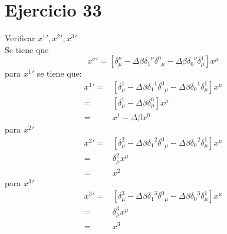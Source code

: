 \section*{Ejercicio 33}
Verificar ${x^1}',{x^2}',{x^3}'$\\
Se tiene que
\begin{equation*}
    {x^\nu}'=\left[\delta_\mu^\nu - \Delta \beta {\delta_1}^\nu {\delta^0}_\mu - \Delta \beta{\delta_0}^\nu \delta_\mu^1\right]x^\mu
\end{equation*}
para ${x^1}'$ se tiene que:
\begin{align*}
    {x^1}'=&\left[\delta_\mu^1 - \Delta \beta {\delta_1}^1 {\delta^0}_\mu - \Delta \beta{\delta_0}^1 \delta_\mu^1\right]x^\mu\\
=&\left[\delta_\mu^1 - \Delta\beta \delta_\mu^0\right] x^\mu\\
=&x^1-\Delta\beta x^0
\end{align*}
para ${x^2}'$
\begin{align*}
    {x^2}'=&\left[\delta_\mu^2 - \Delta \beta {\delta_1}^2 {\delta^0}_\mu - \Delta \beta{\delta_0}^2 \delta_\mu^1\right]x^\mu\\
=& \delta_\mu^2x^\mu\\
=& x^2
\end{align*}
para ${x^3}'$
\begin{align*}
    {x^3}'=&\left[\delta_\mu^3 - \Delta \beta {\delta_1}^3 {\delta^0}_\mu - \Delta \beta{\delta_0}^3 \delta_\mu^1\right]x^\mu\\
=& \delta_\mu^3x^\mu\\
=& x^3
\end{align*}